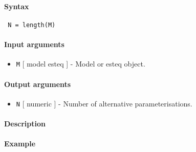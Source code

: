 


	\paragraph{Syntax}
 
 \begin{verbatim}
 N = length(M)
 \end{verbatim}
 
 \paragraph{Input arguments}
 
 \begin{itemize}
 \item
   \texttt{M} {[} model \textbar{} esteq {]} - Model or esteq object.
 \end{itemize}
 
 \paragraph{Output arguments}
 
 \begin{itemize}
 \item
   \texttt{N} {[} numeric {]} - Number of alternative parameterisations.
 \end{itemize}
 
 \paragraph{Description}
 
 \paragraph{Example}


